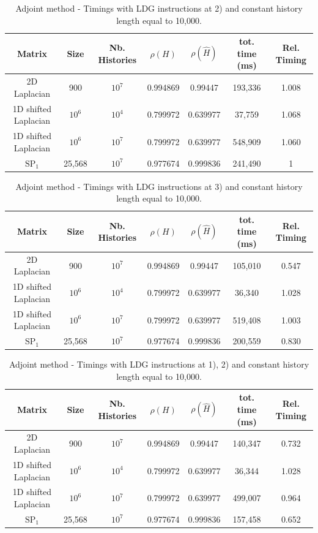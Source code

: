 \documentclass[a4paper,10pt]{article}
\begin{document}
\begin{table}[!h]
\hspace*{-1cm}
\begin{tabular}{|c|c|c|c|c|c|c|}
\hline
\textbf{Matrix} & \textbf{Size} &\textbf{Nb. Histories} & $\rho(H)$ 
& $\rho(\hat{H})$ & tot. time (ms) & Rel. Timing\\
\hline
2D Laplacian& 900 & $10^7$ & 0.994869 & 0.99447 & 193,336 & 1.008\\
\hline 
1D shifted Laplacian& $10^6$ & $10^4$ & 0.799972 & 0.639977 & 37,759 & 1.068\\
\hline
1D shifted Laplacian& $10^6$ & $10^7$ & 0.799972 & 0.639977 & 548,909 & 1.060\\
\hline
$\text{SP}_1$ & 25,568 & $10^7$ & 0.977674 & 0.999836 & 241,490 & 1\\
\hline
\end{tabular}
\caption{Adjoint method - Timings with LDG instructions at 2) and constant 
history length equal 
to 
10,000.}
\label{tab6}
\end{table}


\begin{table}[!h]
\hspace*{-1cm}
\begin{tabular}{|c|c|c|c|c|c|c|}
\hline
\textbf{Matrix} & \textbf{Size} &\textbf{Nb. Histories} & $\rho(H)$ 
& $\rho(\hat{H})$ & tot. time (ms) & Rel. Timing\\
\hline
2D Laplacian& 900 & $10^7$ & 0.994869 & 0.99447 & 105,010 & 0.547\\
\hline 
1D shifted Laplacian& $10^6$ & $10^4$ & 0.799972 & 0.639977 & 36,340 & 1.028\\
\hline
1D shifted Laplacian& $10^6$ & $10^7$ & 0.799972 & 0.639977 & 519,408 & 1.003\\
\hline
$\text{SP}_1$ & 25,568 & $10^7$ & 0.977674 & 0.999836 & 200,559 & 0.830\\
\hline
\end{tabular}
\caption{Adjoint method - Timings with LDG instructions at 3) and constant 
history length equal 
to 
10,000.}
\label{tab7}
\end{table}


\begin{table}[!h]
\hspace*{-1cm}
\begin{tabular}{|c|c|c|c|c|c|c|}
\hline
\textbf{Matrix} & \textbf{Size} &\textbf{Nb. Histories} & $\rho(H)$ 
& $\rho(\hat{H})$ & tot. time (ms) & Rel. Timing\\
\hline
2D Laplacian& 900 & $10^7$ & 0.994869 & 0.99447 & 140,347 & 0.732\\
\hline 
1D shifted Laplacian& $10^6$ & $10^4$ & 0.799972 & 0.639977 & 36,344 & 1.028\\
\hline
1D shifted Laplacian& $10^6$ & $10^7$ & 0.799972 & 0.639977 & 499,007 & 0.964\\
\hline
$\text{SP}_1$ & 25,568 & $10^7$ & 0.977674 & 0.999836 & 157,458 & 0.652\\
\hline
\end{tabular}
\caption{Adjoint method - Timings with LDG instructions at 1), 2) and constant 
history length 
equal 
to 
10,000.}
\label{tab8}
\end{table}
\end{document}
